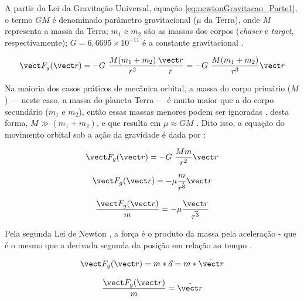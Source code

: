 A partir da Lei da Gravitação Universal, equação \eqref{eq:newtonGravitacao_Parte1}, o termo $G M$ é denominado parâmetro gravitacional ($\mu$ da Terra), onde $M$ representa a massa da Terra; $m_1$ e $m_2$ são as massas dos corpos (\textit{chaser} e \textit{target}, respectivamente); $G = 6{,}6695 \times 10^{-11}$ é a constante gravitacional \cite{halliday2013,wie2008space}.

\begin{equation}
\label{eq:newtonGravitacao_Parte1}
\vect F_g(\vect r) = - G\ \frac{M(m_1+m_2)}{r^2} \frac{\vect r}{r} = - G\ \frac{M(m_1+m_2)}{r^3} {\vect r}
\end{equation}

Na maioria dos casos práticos de mecânica orbital, a massa do corpo primário ($M$) — neste caso, a massa do planeta Terra — é muito maior que a do corpo secundário ($m_1$ e $m_2$), então essas massas menores podem ser ignoradas \cite{Folta2022}, desta forma, $M \gg (m_1 + m_2)$, e que resulta em $\mu \approx GM$ \cite{wie2008space}. Dito isso, a equação do movimento orbital sob a ação da gravidade é dada por \cite{newton1713}:

\begin{equation}
\label{eq:newtonGravitacao_Parte2}
\vect F_g(\vect r) = - G\ \frac{Mm}{r^2} {\vect r}
\end{equation}
 
\begin{equation}
\label{eq:fgParte1}
\vect F_g(\vect r) = -\mu \frac{m}{\vec {r^3}} \vect r
\end{equation}

\begin{equation}
\label{eq:fgParte2}
\frac{\vect F_g(\vect r)}{m} = -\mu \frac{\vect r}{\vec {r^3}}
\end{equation}

Pela segunda Lei de Newton \cite{newton1713}, a força é o produto da massa pela aceleração \cite{halliday2013} - que é o mesmo que a derivada segunda da posição em relação ao tempo \cite{edelstein2018_derivadaSegunda}.

\begin{equation}
\label{eq:F=ma_Halliday2013Parte1}
\vect F_g(\vect r) = m * \vec a = m * \ddot{\vect r}
\end{equation}

\begin{equation}
\label{eq:Fma_Halliday2013_Parte2}
\frac{\vect F_g(\vect r)}{m} = \ddot{\vect r}
\end{equation}

